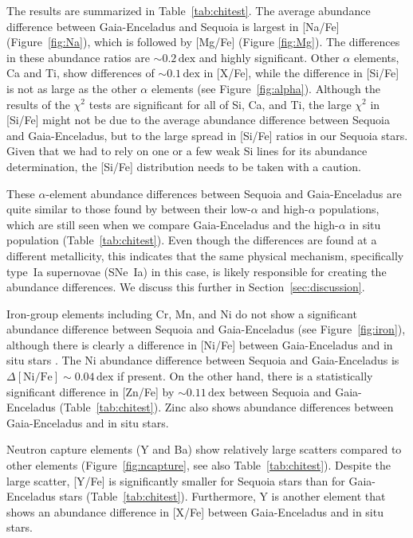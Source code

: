 \documentclass{aa}
\begin{document}
The results are summarized in Table~\ref{tab:chitest}.
The average abundance difference between Gaia-Enceladus and Sequoia is largest in [{Na}/{Fe}] (Figure~\ref{fig:Na}), which is followed by [{Mg}/{Fe}] (Figure \ref{fig:Mg}).  
The differences in these abundance ratios are $\sim 0.2\,\mathrm{dex}$ and highly significant.
Other $\alpha$ elements, Ca and Ti, show differences of $\sim 0.1\,\mathrm{dex}$ in [{X}/{Fe}], while the difference in [{Si}/{Fe}] is not as large as the other $\alpha$ elements (see Figure~\ref{fig:alpha}). 
Although the results of the $\chi^2$ tests are significant for all of Si, Ca, and Ti, the large $\chi^2$ in [{Si}/{Fe}] might not be due to the average abundance difference between Sequoia and Gaia-Enceladus, but to the large spread in [{Si}/{Fe}] ratios in our Sequoia stars. 
Given that we had to rely on one or a few weak Si lines for its abundance determination, the [{Si}/{Fe}] distribution needs to be taken with a caution.

These $\alpha$-element abundance differences between Sequoia and Gaia-Enceladus are quite similar to those found by \citet{Nissen2011} between their low-$\alpha$ and high-$\alpha$ populations, which are still seen when we compare Gaia-Enceladus and the high-$\alpha$ in situ population (Table~\ref{tab:chitest}).
Even though the differences are found at a different metallicity, this indicates that the same physical mechanism, specifically type~Ia supernovae
(SNe~Ia) in this case, is  likely responsible for creating the abundance differences. 
We discuss this further in Section~\ref{sec:discussion}.

Iron-group elements including Cr, Mn, and Ni do not show a significant abundance difference between Sequoia and Gaia-Enceladus (see Figure~\ref{fig:iron}), although there is clearly a difference in [{Ni}/{Fe}] between Gaia-Enceladus and in situ stars \citep[Table~\ref{tab:chitest};][]{Nissen2011}.
The Ni abundance difference between Sequoia and Gaia-Enceladus is $\Delta[\mathrm{Ni/Fe}]\sim 0.04\,\mathrm{dex}$ if present.
On the other hand, there is a statistically significant difference in [{Zn}/{Fe}] by $\sim 0.11\,\mathrm{dex}$ between Sequoia and Gaia-Enceladus (Table~\ref{tab:chitest}).
Zinc also shows abundance differences between Gaia-Enceladus and in situ stars.

Neutron capture elements (Y and Ba) show relatively large scatters compared to other elements (Figure~\ref{fig:ncapture}, see also Table~\ref{tab:chitest}). 
Despite the large scatter, [{Y}/{Fe}] is significantly smaller for  Sequoia stars than for Gaia-Enceladus stars (Table~\ref{tab:chitest}).
Furthermore, Y is another element that shows an abundance difference in [{X}/{Fe}] between Gaia-Enceladus and in situ stars.
\end{document}
